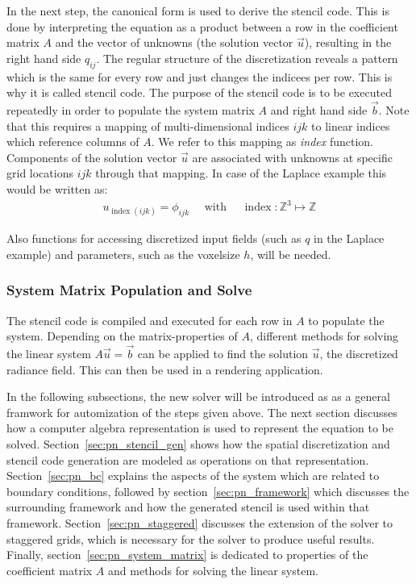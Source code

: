 In the next step, the canonical form is used to derive the stencil code. This is done by interpreting the equation as a product between a row in the coefficient matrix $A$ and the vector of unknowns (the solution vector $\vec{u}$), resulting in the right hand side $q_{ij}$. The regular structure of the discretization reveals a pattern which is the same for every row and just changes the indicees per row. This is why it is called stencil code.
The purpose of the stencil code is to be executed repeatedly in order to populate the system matrix $A$ and right hand side $\vec{b}$. Note that this requires a mapping of multi-dimensional indices $ijk$ to linear indices which reference columns of $A$. We refer to this mapping as \emph{index} function. Components of the solution vector $\vec{u}$ are associated with unknowns at specific grid locations $ijk$ through that mapping. In case of the Laplace example this would be written as:
\begin{align}
u_{\operatorname{index}\left(ijk\right)} = \phi_{ijk}\quad\text{ with }\quad \operatorname{index}: \mathbb{Z}^3\mapsto\mathbb{Z}
\label{eq:pn_index_mapping}
\end{align}

Also functions for accessing discretized input fields (such as $q$ in the Laplace example) and parameters, such as the voxelsize $h$, will be needed.

\subsubsection*{System Matrix Population and Solve}
The stencil code is compiled and executed for each row in $A$ to populate the system. Depending on the matrix-properties of $A$, different methods for solving the linear system $A\vec{u}=\vec{b}$ can be applied to find the solution $\vec{u}$, the discretized radiance field. This can then be used in a rendering application.

In the following subsections, the new solver will be introduced as as a general framwork for automization of the steps given above. The next section discusses how a computer algebra representation is used to represent the equation to be solved. Section~\ref{sec:pn_stencil_gen} shows how the spatial discretization and stencil code generation are modeled as operations on that representation. Section~\ref{sec:pn_bc} explains the aspects of the system which are related to boundary conditions, followed by section~\ref{sec:pn_framework} which discusses the surrounding framework and how the generated stencil is used within that framework. Section~\ref{sec:pn_staggered} discusses the extension of the solver to staggered grids, which is necessary for the solver to produce useful results. Finally, section~\ref{sec:pn_system_matrix} is dedicated to properties of the coefficient matrix $A$ and methods for solving the linear system.

